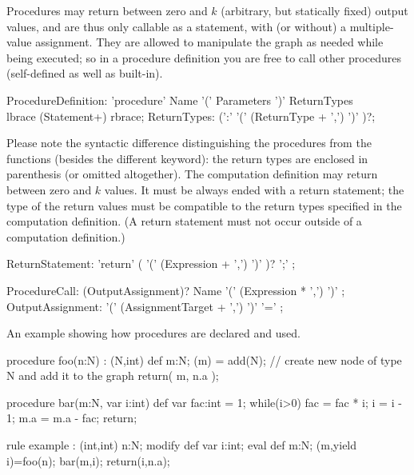 Procedures may return between zero and $k$ (arbitrary, but statically fixed) output values, and are thus only callable as a statement, with (or without) a multiple-value assignment.
They are allowed to manipulate the graph as needed while being executed;
so in a procedure definition you are free to call other procedures (self-defined as well as built-in).

\begin{rail} 
  ProcedureDefinition: 
	'procedure' Name '(' Parameters ')' ReturnTypes \\
	lbrace (Statement+) rbrace;
  ReturnTypes: (':' '(' (ReturnType + ',') ')' )?;
\end{rail}

Please note the syntactic difference distinguishing the procedures from the functions (besides the different keyword): the return types are enclosed in parenthesis (or omitted altogether).
The computation definition may return between zero and $k$ values.
It must be always ended with a return statement; the type of the return values must be compatible to the return types specified in the computation definition.
(A return statement must not occur outside of a computation definition.)

\begin{rail}
  ReturnStatement: 'return' ( '(' (Expression + ',') ')' )? ';' ;
\end{rail}

\begin{rail}
  ProcedureCall: (OutputAssignment)? Name '(' (Expression * ',') ')' ;
  OutputAssignment: '(' (AssignmentTarget + ',') ')' '=' ;
\end{rail}

\begin{example}
An example showing how procedures are declared and used.
  \begin{grgen}
procedure foo(n:N) : (N,int)
{
	def m:N;
	(m) = add(N); // create new node of type N and add it to the graph
	return( m, n.a );
}

procedure bar(m:N, var i:int)
{
	def var fac:int = 1;
	while(i>0) {
		fac = fac * i;
		i = i - 1;
	}
	m.a = m.a - fac;
	return;
}

rule example : (int,int)
{
	n:N;
	modify {
		def var i:int;
		eval {
			def m:N;
			(m,yield i)=foo(n);
			bar(m,i);
		}
		return(i,n.a);
	}
}
  \end{grgen}
\end{example}


